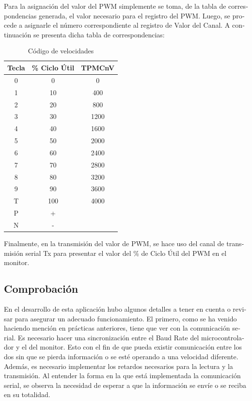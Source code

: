 \documentclass[journal]{IEEEtran}
\begin{document}
\begin{otherlanguage}{spanish}
Para la asignación del valor del PWM simplemente se toma, de la tabla de correspondencias generada, el valor necesario para el registro del PWM. Luego, se procede a asignarle el número correspondiente al registro de Valor del Canal. A continuación se presenta dicha tabla de correspondencias:

\begin{table}[H]
        \label{Salidas}
        \centering
        \caption{Código de velocidades}
        \begin{tabular}{||c||c||c||}
        \hline \hline 
        {\centering \textbf{Tecla}} & {\centering \textbf{\% Ciclo Útil}} & {\centering \textbf{TPMCnV}} \tabularnewline \hline
        0 & 0 & 0 \tabularnewline \hline
         1 & 10 & 400 \tabularnewline \hline
         2 & 20 & 800 \tabularnewline \hline
         3 & 30 & 1200 \tabularnewline \hline
         4 & 40 & 1600 \tabularnewline \hline
         5 & 50 & 2000 \tabularnewline \hline
         6 & 60 & 2400 \tabularnewline \hline
         7 & 70 & 2800 \tabularnewline \hline
         8 & 80 & 3200\tabularnewline \hline
         9 & 90 & 3600\tabularnewline \hline
         T & 100 & 4000\tabularnewline \hline
         \hline
         P & + &  \tabularnewline \hline
         N & - &  \tabularnewline \hline
        \hline 
        \end{tabular}
    \end{table}

Finalmente, en la transmisión del valor de PWM, se hace uso del canal de transmisión serial Tx para presentar el valor del \% de Ciclo Útil del PWM en el monitor.

\subsection{Comprobación}
En el desarrollo de esta aplicación hubo algunos detalles a tener en cuenta o revisar para asegurar un adecuado funcionamiento. El primero, como se ha venido haciendo mención en prácticas anteriores, tiene que ver con la comunicación serial. Es necesario hacer una sincronización entre el Baud Rate del microcontrolador y el del monitor. Esto con el fin de que pueda existir comunicación entre los dos sin que se pierda información o se esté operando a una velocidad diferente. Además, es necesario implementar los retardos necesarios para la lectura y la transmisión. Al entender la forma en la que está implementada la comunicación serial, se observa la necesidad de esperar a que la información se envíe o se reciba en su totalidad.\\


\end{otherlanguage}
\end{document}
